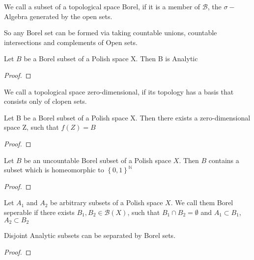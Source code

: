 \documentclass[10pt, a4paper, titlepage]{article}
\numberwithin{equation}{section}
\begin{document}
\begin{definition}
	We call a subset of a topological space Borel, if it is a member of $\mathcal{B}$, the $\sigma-$Algebra generated by the open sets.
\end{definition}

So any Borel set can be formed via taking countable unions, countable intersections and complements of Open sets.


\begin{theorem}
	Let $B$ be a Borel subset of a Polish space X. Then B is Analytic		
\end{theorem}
\begin{proof}
	
\end{proof}

\begin{definition}
	We call a topological space zero-dimensional, if its topology has a basis that consists only of clopen sets.
\end{definition}

\begin{theorem}
	Let B be a Borel subset of a Polish space X. Then there exists a zero-dimensional space Z, such that $f(Z) = B$
\end{theorem}
\begin{proof}
	
\end{proof}


\begin{theorem}
	Let $B$ be an uncountable Borel subset of a Polish space  $X$. Then  $B$ contains a subset which is homeomorphic to  $\left\{ 0,1 \right\}^\mathbb{N}$
	
\end{theorem}
\begin{proof}
	
\end{proof}


\begin{definition}
	Let $A_1$ and  $A_2$ be arbitrary subsets of a Polish space $X$. We call them Borel seperable if there exists  $B_1,B_2 \in \mathcal{B}\left( X \right) $, such that $B_1 \cap B_2 = \emptyset$ and $A_1 \subset B_1$, $A_2 \subset B_2$ 
\end{definition}


\begin{theorem}
	\label{separation_thm}
	Disjoint Analytic subsets can be separated by Borel sets.
\end{theorem}
\begin{proof}
	
\end{proof}
\end{document}
